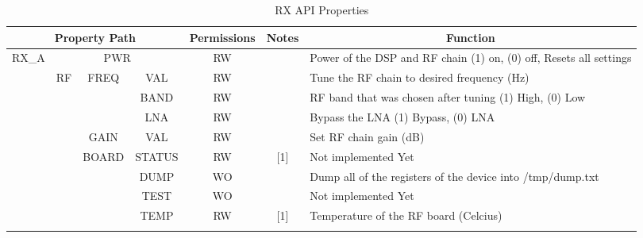 \documentclass[11pt]{article}
\begin{document}
{\begin{landscape}
\begin{table}[H]
\centering
\small
\caption{RX API Properties}
\label{table:rx-api}
\begin{tabular}{|c|c|c|c|c|c|l|}
\hline
\multicolumn{4}{|c|}{{\bf Property Path}}                                             & {\bf Permissions} & {\bf Notes} & \multicolumn{1}{c|}{{\bf Function}}                                   \\ \hline
\multirow{25}{*}{RX\_A}   & \multicolumn{3}{c|}{PWR}                                     & RW                &             & Power of the DSP and RF chain (1) on, (0) off, Resets all settings    \\ \cline{2-7} 
                       & \multirow{9}{*}{RF}     & \multirow{3}{*}{FREQ}  & VAL       & RW                &             & Tune the RF chain to desired frequency (Hz)                           \\ \cline{4-7} 
                       &                         &                        & BAND      & RW                &             & RF band that was chosen after tuning (1) High, (0) Low                \\ \cline{4-7} 
                       &                         &                        & LNA       & RW                &             & Bypass the LNA (1) Bypass, (0) LNA                                    \\ \cline{3-7} 
                       &                         & GAIN                   & VAL       & RW                &             & Set RF chain gain (dB)                                                \\ \cline{3-7} 
                       &                         & \multirow{5}{*}{BOARD} & STATUS    & RW                & [1]         & Not implemented Yet                                                   \\ \cline{4-7} 
                       &                         &                        & DUMP      & WO                &             & Dump all of the registers of the device into /tmp/dump.txt            \\ \cline{4-7} 
                       &                         &                        & TEST      & WO                &             & Not implemented Yet                                                   \\ \cline{4-7} 
                       &                         &                        & TEMP      & RW                & [1]         & Temperature of the RF board (Celcius)                                 \\ \cline{4-7} 

\end{tabular}
\end{table}
\end{landscape}}
\end{document}

